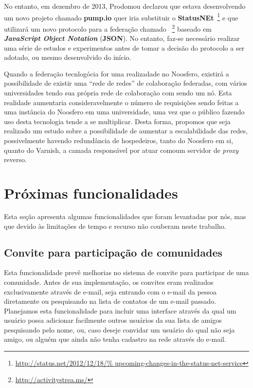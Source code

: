 No entanto, em dezembro de 2013, Prodomou declarou que estava desenvolvendo
um novo projeto chamado \textbf{pump.io} quer iria substituir o
\textbf{StatusNEt}~\footnote{\url{http://status.net/2012/12/18/%
upcoming-changes-in-the-status-net-service}} e que utilizará um novo
protocolo para a federação chamado %
~\footnote{\url{http://activitystrea.ms/}} baseado em \textbf{\textit{%
JavaScript Object Notation}} (\textbf{JSON}).
%
No entanto, faz-se necessário realizar uma série de estudos e experimentos
antes de tomar a decisão do protocolo a ser adotado, ou mesmo desenvolvido
do início.

Quando a federação tecnlogócia for uma realizadade no Noosfero, existirá a
possibilidade de existir uma ``rede de redes'' de colaboração federadas,
com vários universidades tendo sua própria rede de colaboração com sendo
um nó.
%
Esta realidade aumentaria consideravelmente o número de requisições sendo
feitas a uma instância do Noosfero em uma universidade, uma vez que o público
fazendo uso desta tecnologia tende a se multiplicar.
%
Desta forma, propomos que seja realizado um estudo sobre a possibilidade
de aumentar a escalabilidade das redes, possivelmente havendo redundância
de hospedeiros, tanto do Noosfero em si, quanto do Varnish, a camada
responsável por atuar comoum servidor de \textit{proxy} reverso.


\section{Próximas funcionalidades}

Esta seção apresenta algumas funcionalidades que foram levantadas por nós, mas
que devido às limitações de tempo e recurso não couberam neste trabalho.

\subsection{Convite para participação de comunidades}

Esta funcionalidade prevê melhorias no sistema de convite para participar de
uma comunidade. Antes de sua implementação, os convites eram realizados
exclusivamente através de e-mail, seja entrando com o e-mail da pessoa
diretamente ou pesquisando na lista de contatos de um e-mail passado.
%
Planejamos esta funcionalidade para incluir uma interface através da qual um
usuário possa adicionar facilmente outros usuários da sua lista de amigos pesquisando
pelo nome, ou, caso deseje convidar um usuário do qual não seja amigo, ou alguém
que ainda não tenha cadastro na rede através do e-mail.

